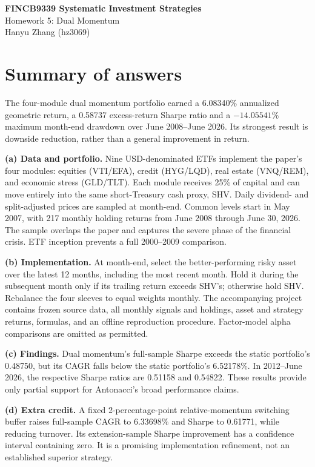 \documentclass[11pt,letterpaper]{article}
\begin{document}
\begin{center}
{\Large\bfseries FINCB9339 Systematic Investment Strategies}\\[5pt]
{\large Homework 5: Dual Momentum}\\[5pt]
Hanyu Zhang (hz3069)
\end{center}
\section*{Summary of answers}
The four-module dual momentum portfolio earned a 6.08340\% annualized geometric return, a 0.58737 excess-return Sharpe ratio and a \(-14.05541\%\) maximum month-end drawdown over June 2008--June 2026. Its strongest result is downside reduction, rather than a general improvement in return.

\textbf{(a) Data and portfolio.} Nine USD-denominated ETFs implement the paper's four modules: equities (VTI/EFA), credit (HYG/LQD), real estate (VNQ/REM), and economic stress (GLD/TLT). Each module receives 25\% of capital and can move entirely into the same short-Treasury cash proxy, SHV. Daily dividend- and split-adjusted prices are sampled at month-end. Common levels start in May 2007, with 217 monthly holding returns from June 2008 through June 30, 2026. The sample overlaps the paper and captures the severe phase of the financial crisis. ETF inception prevents a full 2000--2009 comparison.

\textbf{(b) Implementation.} At month-end, select the better-performing risky asset over the latest 12 months, including the most recent month. Hold it during the subsequent month only if its trailing return exceeds SHV's; otherwise hold SHV. Rebalance the four sleeves to equal weights monthly. The accompanying project contains frozen source data, all monthly signals and holdings, asset and strategy returns, formulas, and an offline reproduction procedure. Factor-model alpha comparisons are omitted as permitted.

\textbf{(c) Findings.} Dual momentum's full-sample Sharpe exceeds the static portfolio's 0.48750, but its CAGR falls below the static portfolio's 6.52178\%. In 2012--June 2026, the respective Sharpe ratios are 0.51158 and 0.54822. These results provide only partial support for Antonacci's broad performance claims.

\textbf{(d) Extra credit.} A fixed 2-percentage-point relative-momentum switching buffer raises full-sample CAGR to 6.33698\% and Sharpe to 0.61771, while reducing turnover. Its extension-sample Sharpe improvement has a confidence interval containing zero. It is a promising implementation refinement, not an established superior strategy.
\end{document}
